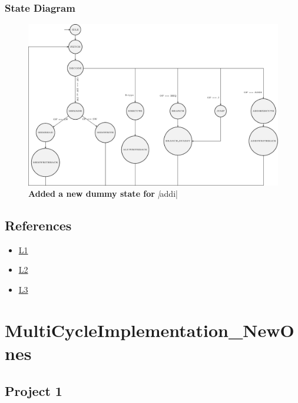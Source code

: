 \documentclass{article}
\begin{document}
\subsubsection*{State Diagram}
\begin{figure}[H]
    \begin{center}
        \includegraphics[scale=0.8]{MultiCycleImplementation/TexFiles/SD3.pdf}
        \caption*{\textbf{Added a new dummy state for }\textit|addi|}
    \end{center}
\end{figure}



\subsection*{References}
\begin{itemize}
    \item \href{https://syssec.ethz.ch/content/dam/ethz/special-interest/infk/inst-infsec/system-security-group-dam/education/Digitaltechnik_14/21_Architecture_MultiCycle.pdf}{L1}
    \item \href{https://nptel.ac.in/courses/106/102/106102062/#downloads}{L2}
    \item \href{https://www.cs.fsu.edu/~zwang/files/cda3101/Fall2017/Lecture6_cda3101.pdf}{L3}
\end{itemize}


\section*{MultiCycleImplementation\_NewOnes}
\subsection*{Project 1}
\end{document}
